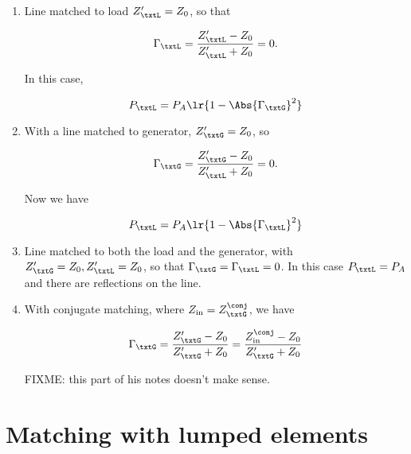 \begin{enumerate}
\item Line matched to load \( Z_\txtL' = Z_0 \), so that

\begin{dmath}\label{eqn:uwavesDeck6LCmatchingCore:80}
\Gamma_\txtL
= \frac{Z_\txtL' - Z_0}{Z_\txtL' + Z_0}
= 0.
\end{dmath}

In this case,

\begin{dmath}\label{eqn:uwavesDeck6LCmatchingCore:100}
P_\txtL = P_A \lr{ 1 - \Abs{\Gamma_\txtG}^2 }
\end{dmath}

\item With a line matched to generator, \( Z_\txtG' = Z_0 \), so

\begin{dmath}\label{eqn:uwavesDeck6LCmatchingCore:120}
\Gamma_\txtG
= \frac{Z_\txtG' - Z_0}{Z_\txtL' + Z_0}
= 0.
\end{dmath}

Now we have

\begin{dmath}\label{eqn:uwavesDeck6LCmatchingCore:140}
P_\txtL = P_A \lr{ 1 - \Abs{\Gamma_\txtL}^2 }
\end{dmath}

\item Line matched to both the load and the generator, with \( Z_\txtG' = Z_0, Z_\txtL' = Z_0 \),
so that \( \Gamma_\txtG = \Gamma_\txtL = 0 \).
In this case \( P_\txtL = P_A \) and there are reflections on the line.

\item With conjugate matching, where \( Z_{\textrm{in}} = Z_\txtG^\conj \), we have

\begin{dmath}\label{eqn:uwavesDeck6LCmatchingCore:160}
\Gamma_\txtG
= \frac{Z_\txtG' - Z_0}{Z_\txtG' + Z_0}
= \frac{Z_{\textrm{in}}^\conj - Z_0}{Z_\txtG' + Z_0}
\end{dmath}

FIXME: this part of his notes doesn't make sense.

\end{enumerate}

\section{Matching with lumped elements}

